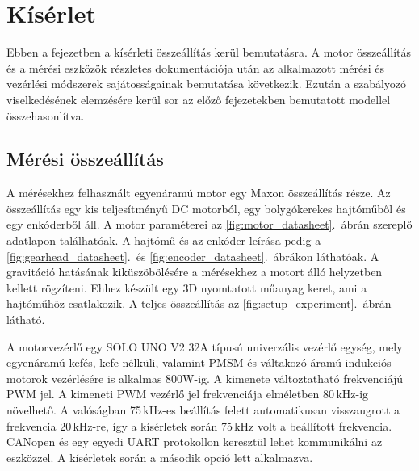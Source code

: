\chapter{Kísérlet}\label{chap:experiment}

Ebben a fejezetben a kísérleti összeállítás kerül bemutatásra. A motor összeállítás és a mérési eszközök 
részletes dokumentációja után az alkalmazott mérési és vezérlési módszerek sajátosságainak bemutatása 
következik. Ezután a szabályozó viselkedésének elemzésére kerül sor az előző fejezetekben bemutatott modellel 
összehasonlítva.

\section{Mérési összeállítás}
A mérésekhez felhasznált egyenáramú motor egy Maxon összeállítás része. Az összeállítás egy 
kis teljesítményű DC motorból, egy bolygókerekes hajtóműből és egy enkóderből áll. A motor paraméterei
az \ref{fig:motor_datasheet}.~ábrán szereplő adatlapon találhatóak. A hajtómű és az enkóder leírása pedig 
a \ref{fig:gearhead_datasheet}.~és \ref{fig:encoder_datasheet}.~ábrákon láthatóak. 
A gravitáció hatásának 
kiküszöbölésére a mérésekhez a motort álló helyzetben kellett rögzíteni. Ehhez készült egy 3D nyomtatott 
műanyag keret, ami a hajtóműhöz csatlakozik. A teljes összeállítás az \ref{fig:setup_experiment}.~ábrán 
látható. 

A motorvezérlő egy SOLO UNO V2 32A típusú univerzális vezérlő egység, mely egyenáramú kefés, kefe 
nélküli, valamint PMSM és váltakozó áramú indukciós motorok vezérlésére is alkalmas 800W-ig. 
A kimenete változtatható frekvenciájú PWM jel. A kimeneti PWM vezérlő jel frekvenciája elméletben 80\,kHz-ig 
növelhető. A valóságban 75\,kHz-es beállítás felett automatikusan visszaugrott a frekvencia 20\,kHz-re, így 
a kísérletek során 75\,kHz volt a beállított frekvencia. CANopen és egy egyedi UART 
protokollon keresztül lehet kommunikálni az eszközzel. A kísérletek során a második opció lett alkalmazva.





